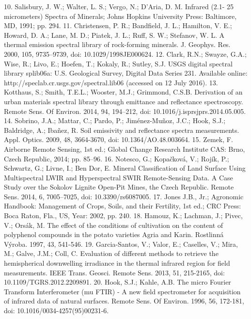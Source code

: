 10.	Salisbury, J. W.; Walter, L. S.; Vergo, N.; D'Aria, D. M. Infrared (2.1- 25 micrometers) Spectra of Minerals;  Johns Hopkins University Press: Baltimore, MD, 1991; pp. 294.
11.	Christensen, P. R.; Bandfield, J. L.; Hamilton, V. E.; Howard, D. A.; Lane, M. D.; Piatek, J. L.; Ruff, S. W.; Stefanov, W. L.  A thermal emission spectral library of rock-forming minerals. J. Geophys. Res. 2000, 105, 9735–9739, doi: 10.1029/1998JE000624.
12.	Clark, R.N.; Swayze, G.A.; Wise, R.; Livo, E.; Hoefen, T.; Kokaly, R.; Sutley, S.J. USGS digital spectral library splib06a: U.S. Geological Survey, Digital Data Series 231. Available online: http://speclab.cr.usgs.gov/spectral.lib06 (accessed on 12 July 2016).
13.	Kotthaus, S.; Smith, T.E.L.; Wooster, M.J.; Grimmond, C.S.B. Derivation of an urban materials spectral library through emittance and reflectance spectroscopy. Remote Sens. Of Environ. 2014, 94, 194–212, doi: 10.1016/j.isprsjprs.2014.05.005.
14.	Sobrino, J.A.; Mattar, C.; Pardo, P.; Jiménez-Muñoz, J.C.; Hook, S.J.; Baldridge, A.; Ibañez, R. Soil emissivity and reflectance spectra measurements. Appl. Optics. 2009, 48, 3664-3670, doi: 10.1364/AO.48.003664.
15.	Zemek, F. Airborne Remote Sensing, 1st ed.; Global Change Research Institute CAS: Brno, Czech Republic, 2014; pp. 85–96.
16.	Notesco, G.; Kopačková, V.; Rojík, P.; Schwartz, G.; Livne, I.; Ben Dor, E. Mineral Classification of Land Surface Using Multispectral LWIR and Hyperspectral SWIR Remote-Sensing Data. A Case Study over the Sokolov Lignite Open-Pit Mines, the Czech Republic. Remote Sens. 2014, 6, 7005–7025, doi: 10.3390/rs6087005.
17.	Jones J.B., Jr.; Agronomic Handbook: Management of Crops, Soils, and their Fertility, 1st ed.; CRC Press: Boca Raton, Fla., US, Year: 2002, pp. 240.
18.	Hamouz, K.; Lachman, J.; Pivec, V.; Orsák, M. The effect of the conditions of cultivation on the content of polyphenol compounds in the potato varieties Agria and Karin. Rostlinná Výroba. 1997, 43, 541-546.
19.	Garcia-Santos, V.; Valor, E.; Caselles, V.; Mira, M.; Galve, J.M.; Coll, C. Evaluation of different methods to retrieve the hemispherical downwelling irradiance in the thermal infrared region for field measurements. IEEE Trans. Geosci. Remote Sens. 2013, 51, 215-2165, doi: 10.1109/TGRS.2012.2209891.
20.	Hook, S.J.; Kahle, A.B. The micro Fourier Transform Interferometer (mu FTIR) - A new field spectrometer for acquisition of infrared data of natural surfaces. Remote Sens. Of Environ. 1996, 56, 172-181, doi: 10.1016/0034-4257(95)00231-6.

